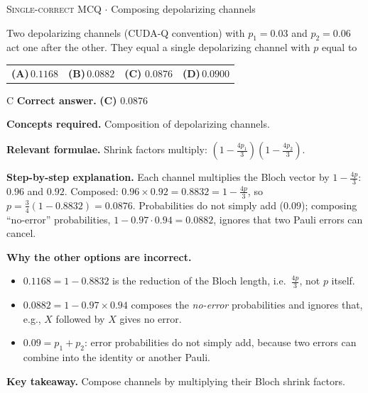 \documentclass[11pt,a4paper]{article}
\newcommand{\optlabel}[1]{\textbf{(#1)}}
\newcommand{\correctlabel}[1]{\textcolor{okgreen}{\textbf{(#1)}\,\ding{51}}}
\newenvironment{qitem}[1]{\begin{list}{}{\setlength{\leftmargin}{3.3em}\setlength{\labelwidth}{3.1em}%
  \setlength{\labelsep}{0.2em}\setlength{\topsep}{3pt}\setlength{\parsep}{3pt}}\item[\textbf{Q.#1}\hfill]}{\end{list}}
\newcommand{\qsep}{\par\vspace{2pt}{\color{black!15}\hrule}\vspace{4pt}}
\newcommand{\qmeta}[2]{{\footnotesize\color{black!60}\textsc{#1} \;$\cdot$\; #2}\par}
\begin{document}
\begin{qitem}{45}
\qmeta{Single-correct MCQ}{Composing depolarizing channels}
Two depolarizing channels (CUDA-Q convention) with $p_1 = 0.03$ and $p_2 = 0.06$ act one after the other. They equal a single depolarizing channel with $p$ equal to
\par\smallskip\noindent\begin{tabularx}{\linewidth}{@{}*{4}{L}@{}}
\optlabel{A}\,$0.1168$ & \optlabel{B}\,$0.0882$ & \correctlabel{C}\,$0.0876$ & \optlabel{D}\,$0.0900$
\end{tabularx}
\end{qitem}
\begin{solbox}{C}
\textbf{\color{brand}Correct answer.} \textcolor{okgreen}{\textbf{(C)}} $0.0876$

\textbf{\color{brand}Concepts required.} Composition of depolarizing channels.

\textbf{\color{brand}Relevant formulae.} Shrink factors multiply: $(1 - \frac{4p_1}{3})(1 - \frac{4p_2}{3})$.

\textbf{\color{brand}Step-by-step explanation.} Each channel multiplies the Bloch vector by $1 - \frac{4p}{3}$: $0.96$ and $0.92$. Composed: $0.96\times0.92 = 0.8832 = 1 - \frac{4p}{3}$, so
$p = \frac34(1 - 0.8832) = 0.0876$. Probabilities do not simply add ($0.09$); composing ``no-error'' probabilities, $1 - 0.97\cdot0.94 = 0.0882$, ignores that two
Pauli errors can cancel.

\textbf{\color{brand}Why the other options are incorrect.}
\begin{itemize}[leftmargin=2.4em, itemsep=1pt, topsep=2pt]
\item[\textbf{(A)}] $0.1168 = 1 - 0.8832$ is the reduction of the Bloch length, i.e.\ $\frac{4p}{3}$, not $p$ itself.
\item[\textbf{(B)}] $0.0882 = 1 - 0.97\times0.94$ composes the \emph{no-error} probabilities and ignores that, e.g., $X$ followed by $X$ gives no error.
\item[\textbf{(D)}] $0.09 = p_1 + p_2$: error probabilities do not simply add, because two errors can combine into the identity or another Pauli.
\end{itemize}
\textbf{\color{brand}Key takeaway.} Compose channels by multiplying their Bloch shrink factors.
\end{solbox}
\qsep
\end{document}
